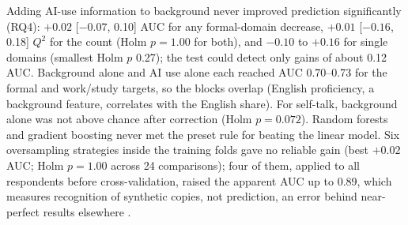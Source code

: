 \documentclass[conference]{IEEEtran}
\begin{document}
Adding AI-use information to background never improved prediction significantly (RQ4): $+0.02$ [$-0.07$, 0.10] AUC for any formal-domain decrease, $+0.01$ [$-0.16$, 0.18] $Q^2$ for the count (Holm $p=1.00$ for both), and $-0.10$ to $+0.16$ for single domains (smallest Holm $p$ 0.27); the test could detect only gains of about 0.12 AUC. Background alone and AI use alone each reached AUC 0.70--0.73 for the formal and work/study targets, so the blocks overlap (English proficiency, a background feature, correlates with the English share). For self-talk, background alone was not above chance after correction (Holm $p=0.072$). Random forests and gradient boosting never met the preset rule for beating the linear model. Six oversampling strategies inside the training folds gave no reliable gain (best $+0.02$ AUC; Holm $p=1.00$ across 24 comparisons); four of them, applied to all respondents before cross-validation, raised the apparent AUC up to 0.89, which measures recognition of synthetic copies, not prediction, an error behind near-perfect results elsewhere \cite{vandewiele2021}.
\end{document}
